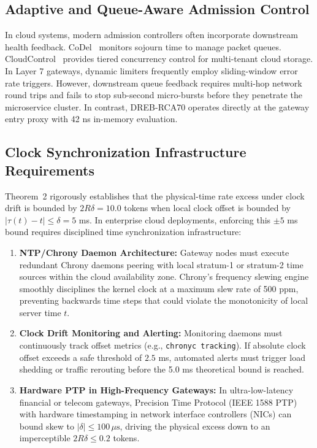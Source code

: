 \documentclass[conference]{IEEEtran}
\begin{document}
\subsection{Adaptive and Queue-Aware Admission Control}
In cloud systems, modern admission controllers often incorporate downstream health feedback. CoDel~\cite{nichols2012controlling} monitors sojourn time to manage packet queues. CloudControl~\cite{li2017cloudcontrol} provides tiered concurrency control for multi-tenant cloud storage. In Layer 7 gateways, dynamic limiters frequently employ sliding-window error rate triggers. However, downstream queue feedback requires multi-hop network round trips and fails to stop sub-second micro-bursts before they penetrate the microservice cluster. In contrast, DREB-RCA70 operates directly at the gateway entry proxy with 42 ns in-memory evaluation.


\subsection{Clock Synchronization Infrastructure Requirements}
Theorem~2 rigorously establishes that the physical-time rate excess under clock drift is bounded by $2R\delta = 10.0$ tokens when local clock offset is bounded by $|\tau(t) - t| \le \delta = 5$ ms. In enterprise cloud deployments, enforcing this $\pm 5$ ms bound requires disciplined time synchronization infrastructure:
\begin{enumerate}
    \item \textbf{NTP/Chrony Daemon Architecture:} Gateway nodes must execute redundant Chrony daemons peering with local stratum-1 or stratum-2 time sources within the cloud availability zone. Chrony's frequency slewing engine smoothly disciplines the kernel clock at a maximum slew rate of 500 ppm, preventing backwards time steps that could violate the monotonicity of local server time $t$.
    \item \textbf{Clock Drift Monitoring and Alerting:} Monitoring daemons must continuously track offset metrics (e.g., \texttt{chronyc tracking}). If absolute clock offset exceeds a safe threshold of $2.5$ ms, automated alerts must trigger load shedding or traffic rerouting before the 5.0 ms theoretical bound is reached.
    \item \textbf{Hardware PTP in High-Frequency Gateways:} In ultra-low-latency financial or telecom gateways, Precision Time Protocol (IEEE 1588 PTP) with hardware timestamping in network interface controllers (NICs) can bound skew to $|\delta| \le 100\,\mu\text{s}$, driving the physical excess down to an imperceptible $2R\delta \le 0.2$ tokens.
\end{enumerate}
\end{document}
